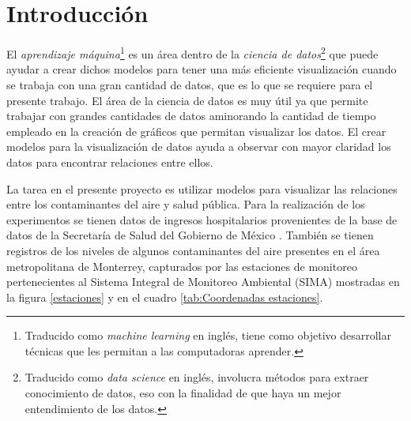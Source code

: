 \chapter{Introducción}

El \emph{aprendizaje máquina}\footnote{Traducido como \emph{machine learning} en inglés, tiene como objetivo desarrollar técnicas que les permitan a las computadoras aprender.} es un área dentro de la \emph{ciencia de datos}\footnote{Traducido como \emph{data science} en inglés, involucra métodos para extraer conocimiento de datos, eso con la finalidad de que haya un mejor entendimiento de los datos.} que puede ayudar a crear dichos modelos para tener una más eficiente visualización cuando se trabaja con una gran cantidad de datos, que es lo que se requiere para el presente trabajo. El área de la ciencia de datos es muy útil ya que permite trabajar con grandes cantidades de datos aminorando la cantidad de tiempo empleado en la creación de gráficos que permitan visualizar los datos. El crear modelos para la visualización de datos ayuda a observar con mayor claridad los datos para encontrar relaciones entre ellos.


La tarea en el presente proyecto es utilizar modelos para visualizar las relaciones entre los contaminantes del aire y salud pública. Para la realización de los experimentos se tienen datos de ingresos hospitalarios provenientes de la base de datos de la Secretaría de Salud del Gobierno de México \cite{f1}. También se tienen registros de los niveles de algunos contaminantes del aire presentes en el área metropolitana de Monterrey, capturados por las estaciones de monitoreo pertenecientes al Sistema Integral de Monitoreo Ambiental (SIMA) \cite{f2} mostradas en la figura \ref{estaciones} y en el cuadro \ref{tab:Coordenadas estaciones}.

